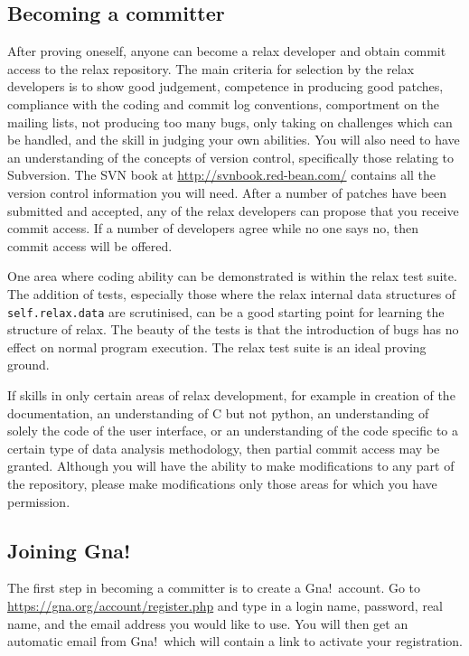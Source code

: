 \subsection{Becoming a committer}\label{becoming a committer}

After proving oneself, anyone can become a relax developer and obtain commit access to the relax repository.  The main criteria for selection by the relax developers is to show good judgement, competence in producing good patches, compliance with the coding and commit log conventions, comportment on the mailing lists, not producing too many bugs, only taking on challenges which can be handled, and the skill in judging your own abilities.  You will also need to have an understanding of the concepts of version control, specifically those relating to Subversion.  The SVN book at \href{http://svnbook.red-bean.com/}{http://svnbook.red-bean.com/} contains all the version control information you will need.  After a number of patches have been submitted and accepted, any of the relax developers can propose that you receive commit access.  If a number of developers agree while no one says no, then commit access will be offered.

One area where coding ability can be demonstrated is within the relax test suite.  The addition of tests, especially those where the relax internal data structures of \texttt{self.relax.data} are scrutinised, can be a good starting point for learning the structure of relax.  The beauty of the tests is that the introduction of bugs has no effect on normal program execution.  The relax test suite is an ideal proving ground.

If skills in only certain areas of relax development, for example in creation of the documentation, an understanding of C but not python, an understanding of solely the code of the user interface, or an understanding of the code specific to a certain type of data analysis methodology, then partial commit access may be granted.  Although you will have the ability to make modifications to any part of the repository, please make modifications only those areas for which you have permission.


\subsection{Joining Gna!}

The first step in becoming a committer is to create a Gna!\ account.  Go to \href{https://gna.org/account/register.php}{https://gna.org/account/register.php} and type in a login name, password, real name, and the email address you would like to use.  You will then get an automatic email from Gna!\ which will contain a link to activate your registration.


